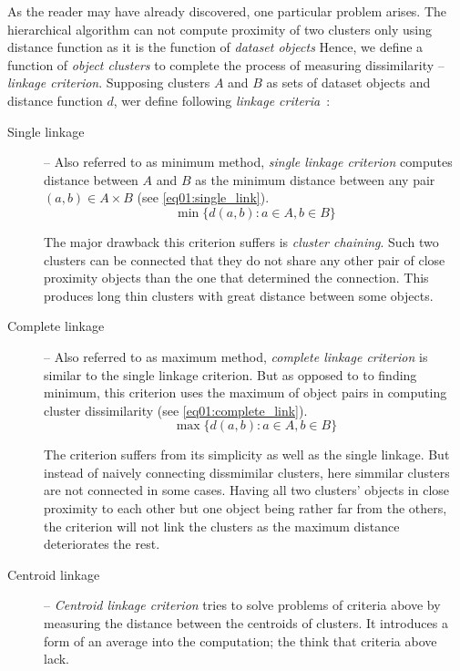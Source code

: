As the reader may have already discovered, one particular problem arises. The hierarchical algorithm can not compute proximity of two clusters only using distance function as it is the function of \emph{dataset objects} Hence, we define a function of \emph{object clusters} to complete the process of measuring dissimilarity -- \emph{linkage criterion}. Supposing clusters $A$ and $B$ as sets of dataset objects and distance function $d$, wer define following \emph{linkage criteria}~\cite{yim2015hierarchical}:

\begin{description}
	\item[Single linkage] -- Also referred to as minimum method, \emph{single linkage criterion} computes distance between $A$ and $B$ as the minimum distance between any pair $(a,b) \in A\times B$ (see  \ref{eq01:single_link}).
	\begin{equation}\label{eq01:single_link}
	\min\{d(a,b) : a \in A, b \in B\}
	\end{equation}
	
	The major drawback this criterion suffers is \emph{cluster chaining}. Such two clusters can be connected that they do not share any other pair of close proximity objects than the one that determined the connection. This produces long thin clusters with great distance between some objects.
	
	\item[Complete linkage] -- Also referred to as maximum method, \emph{complete linkage criterion} is similar to the single linkage criterion. But as opposed to to finding minimum, this criterion uses the maximum of object pairs in computing cluster dissimilarity (see \ref{eq01:complete_link}). 
	\begin{equation}\label{eq01:complete_link}
	\max\{d(a,b) : a \in A, b \in B\}
	\end{equation}
	
	The criterion suffers from its simplicity as well as the single linkage. But instead of naively connecting dissmimilar clusters, here simmilar clusters are not connected in some cases. Having all two clusters' objects in close proximity to each other but one object being rather far from the others, the criterion will not link the clusters as the maximum distance deteriorates the rest.
	
	\item[Centroid linkage] -- \emph{Centroid linkage criterion} tries to solve problems of criteria above by measuring the distance between the centroids of clusters. It introduces a form of an average into the computation; the think that criteria above lack.
\end{description}


